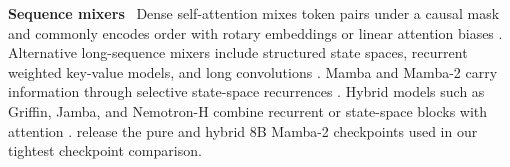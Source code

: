 \documentclass{article}
\newcommand{\runin}[1]{\par\medskip\noindent\textbf{#1}\ }
\begin{document}
\runin{Sequence mixers}
Dense self-attention \citep{vaswani2017attention} mixes token pairs under a causal mask and commonly encodes order with rotary embeddings or linear attention biases \citep{su2024roformer,press2022alibi}.
Alternative long-sequence mixers include structured state spaces, recurrent weighted key-value models, and long convolutions \citep{gu2022s4,peng2023rwkv,poli2023hyena}.
Mamba and Mamba-2 carry information through selective state-space recurrences \citep{gu2023mamba,dao2024mamba2}.
Hybrid models such as Griffin, Jamba, and Nemotron-H combine recurrent or state-space blocks with attention \citep{de2024griffin,lieber2024jamba,nvidia2025nemotronh}.
\citet{waleffe2024empirical} release the pure and hybrid 8B Mamba-2 checkpoints used in our tightest checkpoint comparison.

\end{document}
